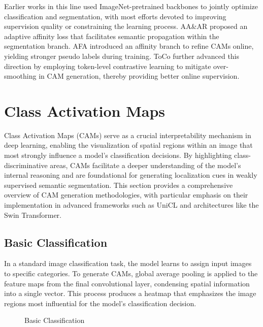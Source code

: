 Earlier works in this line used ImageNet-pretrained backbones \cite{dataset_imagenet} to jointly optimize classification and segmentation, with most efforts devoted to improving supervision quality or constraining the learning process. AA\&AR \cite{wsss_aaar} proposed an adaptive affinity loss that facilitates semantic propagation within the segmentation branch. AFA \cite{wsss_afa_affinity_from_attention} introduced an affinity branch to refine CAMs online, yielding stronger pseudo labels during training. ToCo \cite{wsss_toco_token_contrast} further advanced this direction by employing token-level contrastive learning to mitigate over-smoothing in CAM generation, thereby providing better online supervision.

\section{Class Activation Maps}
\label{sec:class-activation-maps}

Class Activation Maps (CAMs) serve as a crucial interpretability mechanism in deep learning, enabling the visualization of spatial regions within an image that most strongly influence a model's classification decisions. By highlighting class-discriminative areas, CAMs facilitate a deeper understanding of the model's internal reasoning and are foundational for generating localization cues in weakly supervised semantic segmentation. This section provides a comprehensive overview of CAM generation methodologies, with particular emphasis on their implementation in advanced frameworks such as UniCL and architectures like the Swin Transformer.

\subsection{Basic Classification}
\label{subsec:basic_classification}

In a standard image classification task, the model learns to assign input images to specific categories. To generate CAMs, global average pooling is applied to the feature maps from the final convolutional layer, condensing spatial information into a single vector. This process produces a heatmap that emphasizes the image regions most influential for the model's classification decision.

\begin{figure}[htbp]
    \centering
    \caption{Basic Classification}
    \label{fig:basic_classification}
\end{figure}

